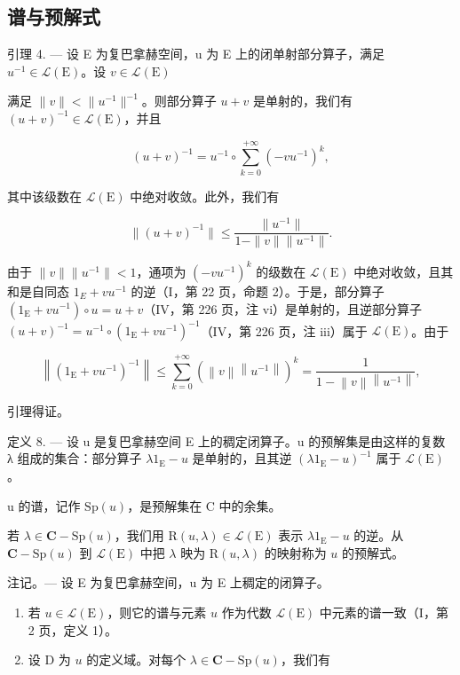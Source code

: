 \subsection{谱与预解式}

引理 4. --- 设 E 为复巴拿赫空间，u 为 E 上的闭单射部分算子，满足 \(u^{-1} \in \mathcal{L}(\mathrm{E})\)。设 \(v \in \mathcal{L}(\mathrm{E})\)

满足 \(\|v\| < \|u^{-1}\|^{-1}\)。则部分算子 \(u + v\) 是单射的，我们有 \((u + v)^{-1} \in \mathcal{L}(\mathrm{E})\)，并且

\[
(u + v) ^ {- 1} = u ^ {- 1} \circ \sum_ {k = 0} ^ {+ \infty} (- v u ^ {- 1}) ^ {k},\tag{6}
\]

其中该级数在 \(\mathcal{L}(\mathrm{E})\) 中绝对收敛。此外，我们有

\[
\| (u + v) ^ {- 1} \| \leqslant \frac {\| u ^ {- 1} \|}{1 - \| v \| \| u ^ {- 1} \|}.
\]

由于 \(\|v\|\|u^{-1}\|<1\)，通项为 \((-vu^{-1})^{k}\) 的级数在 \(\mathcal{L}(\mathrm{E})\) 中绝对收敛，且其和是自同态 \(1_{E}+vu^{-1}\) 的逆（I，第 22 页，命题 2）。于是，部分算子 \((1_{\mathrm{E}}+vu^{-1})\circ u=u+v\)（IV，第 226 页，注 vi）是单射的，且逆部分算子 \((u+v)^{-1}=u^{-1}\circ(1_{\mathrm{E}}+vu^{-1})^{-1}\)（IV，第 226 页，注 iii）属于 \(\mathcal{L}(\mathrm{E})\)。由于

\[
\left\| \left(1 _ {\mathrm{E}} + v u ^ {- 1}\right) ^ {- 1} \right\| \leqslant \sum_ {k = 0} ^ {+ \infty} (\left\| v \right\| \left\| u ^ {- 1} \right\|) ^ {k} = \frac {1}{1 - \left\| v \right\| \left\| u ^ {- 1} \right\|},
\]

引理得证。

定义 8. --- 设 u 是复巴拿赫空间 E 上的稠定闭算子。u 的预解集是由这样的复数 λ 组成的集合：部分算子 \(\lambda 1_{\mathrm{E}} - u\) 是单射的，且其逆 \((\lambda 1_{\mathrm{E}} - u)^{-1}\) 属于 \(\mathcal{L}(\mathrm{E})\)。

u 的谱，记作 \(\mathrm{Sp}(u)\)，是预解集在 C 中的余集。

若 \(\lambda \in \mathbf{C} - \mathrm{Sp}(u)\)，我们用 \(\mathrm{R}(u,\lambda) \in \mathcal{L}(\mathrm{E})\) 表示 \(\lambda 1_{\mathrm{E}} - u\) 的逆。从 \(\mathbf{C} - \mathrm{Sp}(u)\) 到 \(\mathcal{L}(\mathrm{E})\) 中把 \(\lambda\) 映为 \(\mathrm{R}(u,\lambda)\) 的映射称为 \(u\) 的预解式。

注记。--- 设 E 为复巴拿赫空间，u 为 E 上稠定的闭算子。

\begin{enumerate}
\def\labelenumi{\arabic{enumi})}
\item
  若 \(u \in \mathcal{L}(\mathrm{E})\)，则它的谱与元素 \(u\) 作为代数 \(\mathcal{L}(\mathrm{E})\) 中元素的谱一致（I，第 2 页，定义 1）。
\item
  设 D 为 \(u\) 的定义域。对每个 \(\lambda \in \mathbf{C} - \mathrm{Sp}(u)\)，我们有
\end{enumerate}

